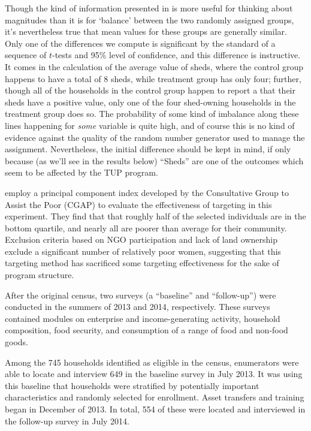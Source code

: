 \documentclass[11pt]{article}
\begin{document}
Though the kind of information presented in  is
more useful for thinking about magnitudes than it is for `balance'
between the two randomly assigned groups, it's nevertheless true
that mean values for these groups are generally similar.  Only one
of the differences we compute is significant by the standard of a
sequence of \(t\)-tests and 95\% level of confidence, and this
difference is instructive.  It comes in the calculation of the
average value of sheds, where the control group happens to have a
total of 8 sheds, while treatment group has only four; further,
though all of the households in the control group happen to report a
that their sheds have a positive value, only one of the four
shed-owning households in the treatment group does so.  The
probability of some kind of imbalance along these lines happening
for \emph{some} variable is quite high, and of course this is no kind of
evidence against the quality of the random number generator used to
manage the assignment.  Nevertheless, the initial difference should
be kept in mind, if only because (as we'll see in the results below)
``Sheds'' are one of the outcomes which seem to be affected by the TUP
program.

\cite{chowdhury-morel15} employ a principal component index developed by the
Consultative Group to Assist the Poor (CGAP) to evaluate the effectiveness of
targeting in this experiment. They find that that roughly half of the selected
individuals are in the bottom quartile, and nearly all are poorer than average for
their community. Exclusion criteria based on NGO participation and lack of land
ownership exclude a significant number of relatively poor women, suggesting that
this targeting method has sacrificed some targeting effectiveness for the sake of
program structure.

After the original census, two surveys (a ``baseline'' and
``follow-up'') were conducted in the summers of 2013 and 2014,
respectively.  These surveys contained modules on enterprise and
income-generating activity, household composition, food security,
and consumption of a range of food and non-food goods.

Among the 745 households identified as eligible in the census,
enumerators were able to locate and interview 649 in the baseline
survey in July 2013. It was using this baseline that households were stratified by
potentially important characteristics and randomly selected for enrollment. Asset
transfers and training began in December of 2013. In total, 554 of these were
located and interviewed in the follow-up survey in July 2014. 
\end{document}
